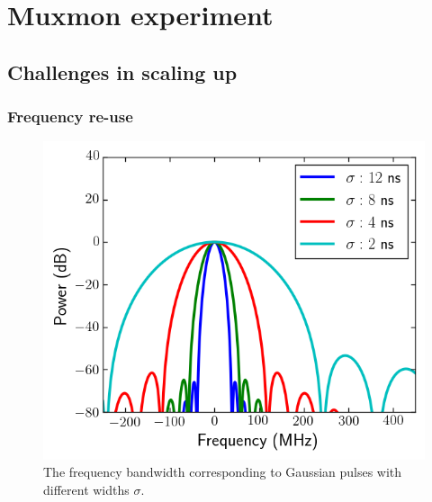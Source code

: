 

\part{Muxmon experiment}

  \chapter{Challenges in scaling up}
    \label{ch:Challenges in scaling up}

    \section{Frequency re-use}
      \label{sec:frequency re-use}

      \begin{figure}
        \begin{center}
        \vspace{-30pt}
          \includegraphics[width=\textwidth]{../Figures/Exploring frequency re-use/bandwidth_broadening.png}
        \end{center}
        \caption{The frequency bandwidth corresponding to Gaussian pulses with different widths $\sigma$.}
        \label{fig:bandwidth broadening}
        \vspace{-20pt}
      \end{figure}

